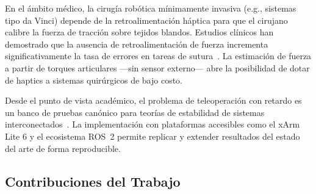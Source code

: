 \documentclass[journal,10pt,twoside]{IEEEtran}
\begin{document}
En el ámbito médico, la cirugía robótica mínimamente invasiva (e.g.,
sistemas tipo da Vinci) depende de la retroalimentación háptica para
que el cirujano calibre la fuerza de tracción sobre tejidos blandos.
Estudios clínicos han demostrado que la ausencia de retroalimentación
de fuerza incrementa significativamente la tasa de errores en tareas de
sutura~\cite{siciliano2009}. La estimación de fuerza a partir de
torques articulares —sin sensor externo— abre la posibilidad de dotar
de haptics a sistemas quirúrgicos de bajo costo.

Desde el punto de vista académico, el problema de teleoperación con
retardo es un banco de pruebas canónico para teorías de estabilidad de
sistemas interconectados~\cite{colgate1993,spong2006}. La
implementación con plataformas accesibles como el xArm Lite 6 y el
ecosistema ROS~2 permite replicar y extender resultados del estado del
arte de forma reproducible.

\subsection{Contribuciones del Trabajo}
\end{document}
